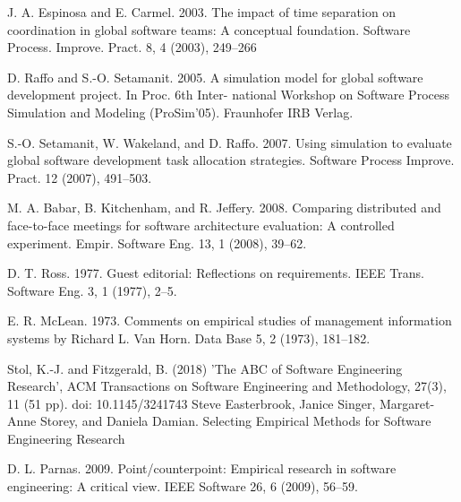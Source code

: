 \documentclass[runningheads]{llncs}
\begin{document}
\begin{thebibliography}{8}
J. A. Espinosa and E. Carmel. 2003. The impact of time separation on coordination in global software teams: A
conceptual foundation. Software Process. Improve. Pract. 8, 4 (2003), 249–266

D. Raffo and S.-O. Setamanit. 2005. A simulation model for global software development project. In Proc. 6th Inter-
national Workshop on Software Process Simulation and Modeling (ProSim’05). Fraunhofer IRB Verlag.

S.-O. Setamanit, W. Wakeland, and D. Raffo. 2007. Using simulation to evaluate global software development task
allocation strategies. Software Process Improve. Pract. 12 (2007), 491–503.

M. A. Babar, B. Kitchenham, and R. Jeffery. 2008. Comparing distributed and face-to-face meetings for software
architecture evaluation: A controlled experiment. Empir. Software Eng. 13, 1 (2008), 39–62.

D. T. Ross. 1977. Guest editorial: Reflections on requirements. IEEE Trans. Software Eng. 3, 1 (1977), 2–5.

E. R. McLean. 1973. Comments on empirical studies of management information systems by Richard L. Van Horn.
Data Base 5, 2 (1973), 181–182.

Stol, K.-J. and Fitzgerald, B. (2018) 'The ABC of Software Engineering Research', ACM Transactions on Software Engineering and Methodology, 27(3), 11 (51 pp). doi: 10.1145/3241743
Steve Easterbrook, Janice Singer, Margaret-Anne Storey, and Daniela Damian. Selecting Empirical Methods for Software Engineering Research

D. L. Parnas. 2009. Point/counterpoint: Empirical research in software engineering: A critical view. IEEE Software
26, 6 (2009), 56–59.

\end{thebibliography}
\end{document}
